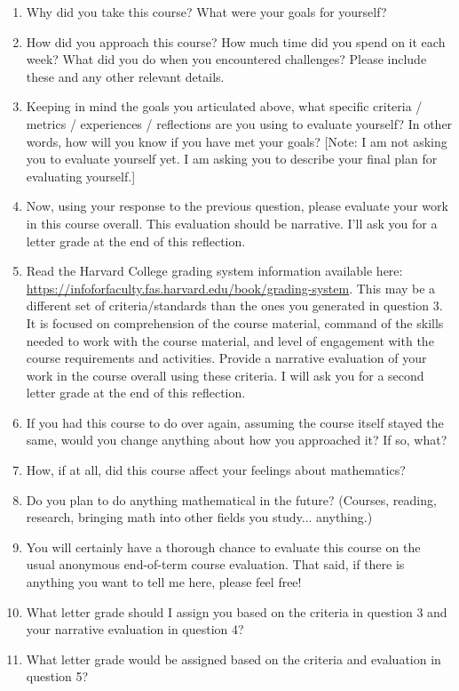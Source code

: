 \documentclass[12pt,letterpaper,noanswers]{exam}
\begin{document}
 \pdfpageheight 11in 
  \pdfpagewidth 8.5in

\noindent 





\begin{enumerate}
    \item Why did you take this course? What were your goals for yourself?
    \item How did you approach this course? How much time did you spend on it each week? What did you do when you encountered challenges? Please include these and any other relevant details.
    \item Keeping in mind the goals you articulated above, what specific criteria / metrics / experiences / reflections are you using to evaluate yourself? In other words, how will you know if you have met your goals? [Note: I am not asking you to evaluate yourself yet. I am asking you to describe your final plan for evaluating yourself.]
    \item Now, using your response to the previous question, please evaluate your work in this course overall. This evaluation should be narrative. I'll ask you for a letter grade at the end of this reflection.
    \item Read the Harvard College grading system information available here: \url{https://infoforfaculty.fas.harvard.edu/book/grading-system}. This may be a different set of criteria/standards than the ones you generated in question 3.  It is focused on comprehension of the course material, command of the skills needed to work with the course material, and level of engagement with the course requirements and activities.  Provide a narrative evaluation of your work in the course overall using these criteria.  I will ask you for a second letter grade at the end of this reflection.
    \item If you had this course to do over again, assuming the course itself stayed the same, would you change anything about how you approached it? If so, what?
    \item How, if at all, did this course affect your feelings about mathematics?
    \item Do you plan to do anything mathematical in the future? (Courses, reading, research, bringing math into other fields you study... anything.)
    \item You will certainly have a thorough chance to evaluate this course on the usual anonymous end-of-term course evaluation. That said, if there is anything you want to tell me here, please feel free!
    \item What letter grade should I assign you based on the criteria in question 3 and your narrative evaluation in question 4?
    \item What letter grade would be assigned based on the criteria and evaluation in question 5?  
    

\end{enumerate}
\end{document}
